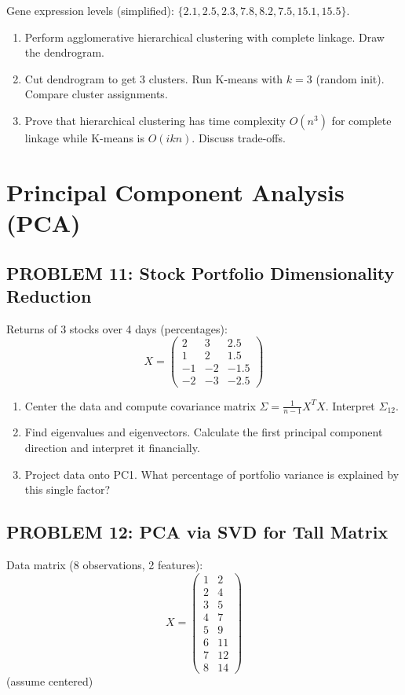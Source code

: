 \documentclass[12pt]{article}
\begin{document}
Gene expression levels (simplified): \(\{2.1, 2.5, 2.3, 7.8, 8.2, 7.5, 15.1, 15.5\}\).

\begin{enumerate}
\item[(a)] Perform agglomerative hierarchical clustering with complete linkage. Draw the dendrogram.
\item[(b)] Cut dendrogram to get 3 clusters. Run K-means with \(k=3\) (random init). Compare cluster assignments.
\item[(c)] Prove that hierarchical clustering has time complexity \(O(n^3)\) for complete linkage while K-means is \(O(ikn)\). Discuss trade-offs.
\end{enumerate}

\newpage
\section*{Principal Component Analysis (PCA)}

\subsection*{PROBLEM 11: Stock Portfolio Dimensionality Reduction}

Returns of 3 stocks over 4 days (percentages):
\[
X = \begin{pmatrix}
2 & 3 & 2.5 \\
1 & 2 & 1.5 \\
-1 & -2 & -1.5 \\
-2 & -3 & -2.5
\end{pmatrix}
\]

\begin{enumerate}
\item[(a)] Center the data and compute covariance matrix \(\Sigma = \frac{1}{n-1}X^TX\). Interpret \(\Sigma_{12}\).
\item[(b)] Find eigenvalues and eigenvectors. Calculate the first principal component direction and interpret it financially.
\item[(c)] Project data onto PC1. What percentage of portfolio variance is explained by this single factor?
\end{enumerate}

\subsection*{PROBLEM 12: PCA via SVD for Tall Matrix}

Data matrix (8 observations, 2 features):
\[
X = \begin{pmatrix}
1 & 2 \\
2 & 4 \\
3 & 5 \\
4 & 7 \\
5 & 9 \\
6 & 11 \\
7 & 12 \\
8 & 14
\end{pmatrix}
\]
(assume centered)
\end{document}
